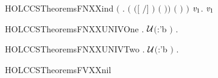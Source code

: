 \begin{SaveVerbatim}{HOLCCSTheoremsFNXXind}
       \ensuremath{(}\HOLSymConst{\HOLTokenForall{}}  .
            \ensuremath{(}   \HOLSymConst{\HOLTokenImp{}}  \ensuremath{(}\ensuremath{[}  \ensuremath{/}\ensuremath{]} \ensuremath{)} \ensuremath{(}  \ensuremath{)}\ensuremath{)} \HOLSymConst{\HOLTokenImp{}}
             \ensuremath{(}  \ensuremath{)} \ensuremath{)} \HOLSymConst{\HOLTokenImp{}}
       \HOLSymConst{\HOLTokenForall{}} \ensuremath{\HOLBoundVar{v}\sb{\mathrm{1}}}.   \ensuremath{\HOLBoundVar{v}\sb{\mathrm{1}}}
\end{SaveVerbatim}
\newcommand{\HOLCCSTheoremsFNXXind}{\UseVerbatim{HOLCCSTheoremsFNXXind}}
\begin{SaveVerbatim}{HOLCCSTheoremsFNXXUNIVOne}
\HOLTokenTurnstile{} \HOLSymConst{\HOLTokenForall{}}.   \HOLSymConst{\HOLTokenNotEqual{}} \ensuremath{{\cal{U}}}\ensuremath{(}:'b \ensuremath{)} \HOLSymConst{\HOLTokenImp{}} \HOLSymConst{\HOLTokenExists{}}.  \HOLConst{\HOLTokenNotIn{}}  
\end{SaveVerbatim}
\newcommand{\HOLCCSTheoremsFNXXUNIVOne}{\UseVerbatim{HOLCCSTheoremsFNXXUNIVOne}}
\begin{SaveVerbatim}{HOLCCSTheoremsFNXXUNIVTwo}
\HOLTokenTurnstile{} \HOLSymConst{\HOLTokenForall{}} .
         \HOLConst{\HOLTokenUnion{}}   \HOLSymConst{\HOLTokenNotEqual{}} \ensuremath{{\cal{U}}}\ensuremath{(}:'b \ensuremath{)} \HOLSymConst{\HOLTokenImp{}}
       \HOLSymConst{\HOLTokenExists{}}.  \HOLConst{\HOLTokenNotIn{}}   \HOLSymConst{\HOLTokenConj{}}  \HOLConst{\HOLTokenNotIn{}}  
\end{SaveVerbatim}
\newcommand{\HOLCCSTheoremsFNXXUNIVTwo}{\UseVerbatim{HOLCCSTheoremsFNXXUNIVTwo}}
\begin{SaveVerbatim}{HOLCCSTheoremsFVXXnil}
\HOLTokenTurnstile{}   \HOLSymConst{\ensuremath{=}} \HOLTokenLeftbrace{}\HOLTokenRightbrace{}
\end{SaveVerbatim}
